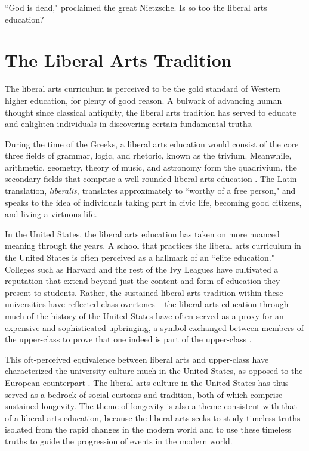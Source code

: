 \documentclass[12pt,letterpaper]{article}
\newif\ifdraft
\begin{document}
\ifdraft
And I too was one of them, and there I looked, just couldn't help but noticing a certain look in Puett's face that can best be described as pity.
\fi

``God is dead," proclaimed the great Nietzsche.  Is so too the liberal arts education?

\section{The Liberal Arts Tradition}
The liberal arts curriculum is perceived to be the gold standard of Western higher education, for plenty of good reason.  A bulwark of advancing human thought since classical antiquity, the liberal arts tradition has served to educate and enlighten individuals in discovering certain fundamental truths.

During the time of the Greeks, a liberal arts education would consist of the core three fields of grammar, logic, and rhetoric, known as the trivium.  Meanwhile, arithmetic, geometry, theory of music, and astronomy form the quadrivium, the secondary fields that comprise a well-rounded liberal arts education \cite{tubbs_philosophy_2015}.  The Latin translation, \textit{liberalis}, translates approximately to ``worthy of a free person," and speaks to the idea of individuals taking part in civic life, becoming good citizens, and living a virtuous life.  

In the United States, the liberal arts education has taken on more nuanced meaning through the years.  A school that practices the liberal arts curriculum in the United States is often perceived as a hallmark of an ``elite education."  Colleges such as Harvard and the rest of the Ivy Leagues have cultivated a reputation that extend beyond just the content and form of education they present to students.  Rather, the sustained liberal arts tradition within these universities have reflected class overtones -- the liberal arts education through much of the history of the United States have often served as a proxy for an expensive and sophisticated upbringing, a symbol exchanged between members of the upper-class to prove that one indeed is part of the upper-class \cite{}.  

This oft-perceived equivalence between liberal arts and upper-class have characterized the university culture much in the United States, as opposed to the European counterpart \cite{}.  The liberal arts culture in the United States has thus served as a bedrock of social customs and tradition, both of which comprise sustained longevity.  The theme of longevity is also a theme consistent with that of a liberal arts education, because the liberal arts seeks to study timeless truths isolated from the rapid changes in the modern world and to use these timeless truths to guide the progression of events in the modern world.
\end{document}
